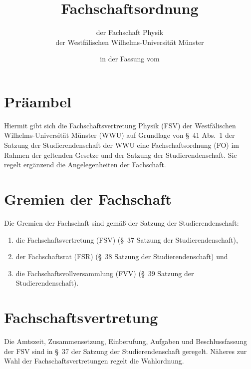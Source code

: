 


\pagestyle{scrheadings}

\title{Fachschaftsordnung}
\subtitle{der Fachschaft Physik\\
der Westfälischen Wilhelms-Universität Münster}
\date{in der Fassung vom }
\author{}



\maketitle

\section{Präambel}
Hiermit gibt sich die Fachschaftsvertretung Physik (FSV) der Westfälischen Wilhelms-Universi\-tät Münster (WWU) auf Grundlage von §~41 Abs.~1 der Satzung der Studierendenschaft der WWU eine Fachschaftsordnung (FO) im Rahmen der geltenden Gesetze und der Satzung der Studierendenschaft. Sie regelt ergänzend die Angelegenheiten der Fachschaft.

\section{Gremien der Fachschaft}
Die Gremien der Fachschaft sind gemäß der Satzung der Studierendenschaft:
\begin{enumerate}
	\item die Fachschaftsvertretung (FSV) (§~37 Satzung der Studierendenschaft),
	\item der Fachschaftsrat (FSR) (§~38 Satzung der Studierendenschaft) und 
	\item die Fachschaftsvollversammlung (FVV) (§~39 Satzung der Studierendenschaft).
\end{enumerate}

\section{Fachschaftsvertretung}
Die Amtszeit, Zusammensetzung, Einberufung, Aufgaben und Beschlussfassung der FSV sind in §~37 der Satzung der Studierendenschaft geregelt. Näheres zur Wahl der Fachschaftsvertretungen regelt die Wahlordnung.

